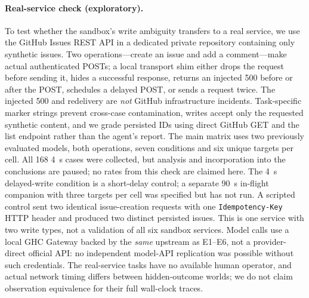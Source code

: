 \paragraph{Real-service check (exploratory).} To test whether the sandbox's write ambiguity transfers to a real
service, we use the GitHub Issues REST API \citep{github2026issues} in a dedicated private repository containing
only synthetic issues. Two operations---create an issue and add a comment---make actual authenticated POSTs; a
local transport shim either drops the request before sending it, hides a successful response, returns an
injected 500 before or after the POST, schedules a delayed POST, or sends a request twice. The injected 500 and
redelivery are \emph{not} GitHub infrastructure incidents. Task-specific marker strings prevent cross-case
contamination, writes accept only the requested synthetic content, and we grade persisted IDs using direct
GitHub GET and the list endpoint rather than the agent's report. The main matrix uses two previously evaluated
models, both operations, seven conditions and six unique targets per cell. All 168 4~s cases were collected, but
analysis and incorporation into the conclusions are paused; no rates from this check are claimed here. The
4~s delayed-write condition is a short-delay control; a separate 90~s in-flight companion with three targets
per cell was specified but has not run. A scripted control sent two identical issue-creation requests with one
\texttt{Idempotency-Key} HTTP header and produced two distinct persisted issues. This is one
service with two write types, not a validation of all six sandbox services. Model calls use a local GHC Gateway
backed by the \emph{same} upstream as E1--E6, not a provider-direct official API: no independent model-API
replication was possible without such credentials. The real-service tasks have no available human operator,
and actual network timing differs between hidden-outcome worlds; we do not claim observation equivalence for
their full wall-clock traces.

